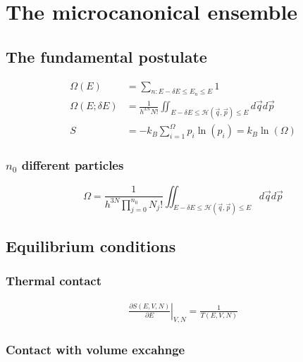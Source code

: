 \section{The microcanonical ensemble}

\subsection*{The fundamental postulate}

\begin{equation*}
    \begin{aligned}
        \Omega(E) &= \sum_{n: E- \delta E \leq E_n \leq E} 1 \\
        \Omega(E; \delta E) &= \frac{1}{h^{3N} N!}  \iint_{E- \delta E \leq \mathcal{H}(\vec{q}, \vec{p}) \leq E} d \vec{q} d \vec{p} \\
        S &= -k_B \sum_{i=1}^\Omega p_i \ln (p_i) = k_B \ln (\Omega)
    \end{aligned}
\end{equation*}

\subsubsection*{$n_0$ different particles}
\begin{equation*}
    \Omega = \frac{1}{h^{3N} \prod_{j=0}^{n_0}N_j!}  \iint_{E- \delta E \leq \mathcal{H}(\vec{q}, \vec{p}) \leq E} d \vec{q} d \vec{p}
\end{equation*}

\subsection*{Equilibrium conditions}

\subsubsection*{Thermal contact}
\begin{equation*}
    \begin{aligned}
        \left. \frac{\partial S (E,V,N)}{\partial E} \right|_{V,N} = \frac{1}{T(E,V,N)}
    \end{aligned}
\end{equation*}

\subsubsection*{Contact with volume excahnge}

